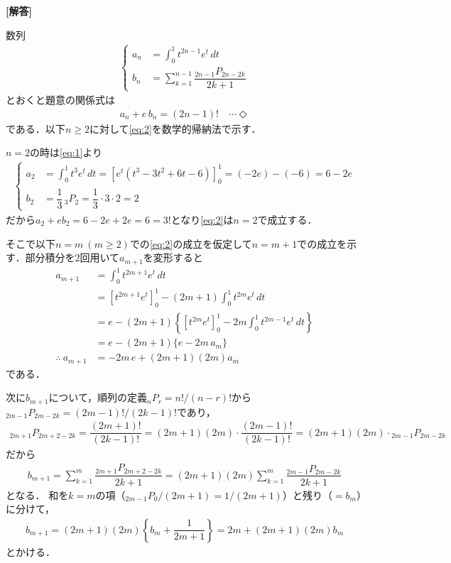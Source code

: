 \documentclass[../../main.tex]{subfiles}
\begin{document}
\begin{oframed}
  
\end{oframed}

{\bf [解答]}

数列
\begin{align}
  \begin{cases}
    a_n&=\displaystyle\int_0^1t^{2n-1}e^t\,dt \\
    b_n&=\displaystyle\sum_{k=1}^{n-1}\dfrac{{}_{2n-1}P_{2n-2k}}{2k+1}
  \end{cases} \label{eq:1}
\end{align}
とおくと題意の関係式は
\begin{align}
  a_n+e\,b_n=(2n-1)! \quad\cdots\Diamond \label{eq:2}
\end{align}
である．以下$n\ge 2$に対して\cref{eq:2}を数学的帰納法で示す．

$n=2$の時は\cref{eq:1}より
\begin{align}
  \begin{cases}
    a_2&=\int_0^1t^3e^t\,dt=\left[e^t(t^3-3t^2+6t-6)\right]_0^1=(-2e)-(-6)=6-2e \\
    b_2&=\dfrac{1}{3}\,{}_3P_2=\dfrac{1}{3}\cdot3\cdot2=2
  \end{cases}
\end{align}
だから$a_2+eb_2=6-2e+2e=6=3!$となり\cref{eq:2}は$n=2$で成立する．

そこで以下$n=m\ (m\ge2)$での\cref{eq:2}の成立を仮定して$n=m+1$での成立を示す．部分積分を2回用いて$a_{m+1}$を変形すると
\begin{align}
  a_{m+1}
  &=\int_0^1t^{2m+1}e^t\,dt \\
  &=\left[t^{2m+1}e^t\right]_0^1-(2m+1)\int_0^1t^{2m}e^t\,dt \\
  &=e-(2m+1)\left\{\left[t^{2m}e^t\right]_0^1-2m\int_0^1t^{2m-1}e^t\,dt\right\} \\
  &=e-(2m+1)\{e-2m\,a_m\} \\
  \therefore\
  a_{m+1}&=-2m\,e+(2m+1)(2m)a_m \label{eq:3}
\end{align}
である．

次に$b_{m+1}$について，順列の定義${}_nP_r=n!/(n-r)!$から${}_{2m-1}P_{2m-2k}=(2m-1)!/(2k-1)!$であり，
\begin{align}
  {}_{2m+1}P_{2m+2-2k}=\dfrac{(2m+1)!}{(2k-1)!}=(2m+1)(2m)\cdot\dfrac{(2m-1)!}{(2k-1)!}=(2m+1)(2m)\cdot{}_{2m-1}P_{2m-2k}
\end{align}
だから
\begin{align}
  b_{m+1}=\sum_{k=1}^m\dfrac{{}_{2m+1}P_{2m+2-2k}}{2k+1}=(2m+1)(2m)\sum_{k=1}^m\dfrac{{}_{2m-1}P_{2m-2k}}{2k+1}
\end{align}
となる．
和を$k=m$の項（${}_{2m-1}P_0/(2m+1)=1/(2m+1)$）と残り（$=b_m$）に分けて，
\begin{align}
  b_{m+1}=(2m+1)(2m)\left\{b_m+\dfrac{1}{2m+1}\right\}=2m+(2m+1)(2m)b_m \label{eq:4}
\end{align}
とかける．
\end{document}

